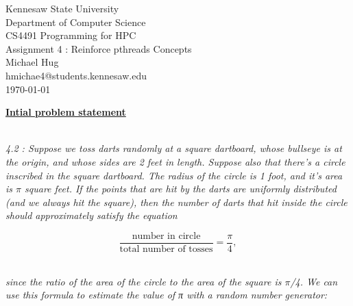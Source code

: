 \documentclass{article}
\begin{document}
\pagestyle{empty} 

\begin{titlepage}

\begin{center}

\LARGE

\vspace*{\fill}
Kennesaw State University \\
\vspace*{\fill}
Department of Computer Science \\
\vspace*{\fill}
CS4491 Programming for HPC \\
\vspace*{\fill}
Assignment 4 : Reinforce pthreads Concepts \\
\vspace*{\fill}
Michael Hug \\
\vspace*{\fill}
hmichae4@students.kennesaw.edu \\
\vspace*{\fill}
\today \\
\vspace*{\fill}

\normalsize

\end{center}

\end{titlepage}

\noindent \textbf{\underline{Intial problem statement}}

\emph
{
	\\4.2 : Suppose we toss darts randomly at a square dartboard, whose bullseye is at the
	origin, and whose sides are 2 feet in length. Suppose also that there’s a circle
	inscribed in the square dartboard. The radius of the circle is 1 foot, and it’s area
	is $\pi$ square feet. If the points that are hit by the darts are uniformly distributed
	(and we always hit the square), then the number of darts that hit inside the circle
	should approximately satisfy the equation
} 

\begin{center}

\[
	\frac{\text{number in circle}}{\text{total number of tosses}}  = \frac{\pi}{4},
\]

\end{center}

\emph
{
	\\since the ratio of the area of the circle to the area of the square is $\pi$/4.
	We can use this formula to estimate the value of π with a random number
	generator:
}
\end{document}
